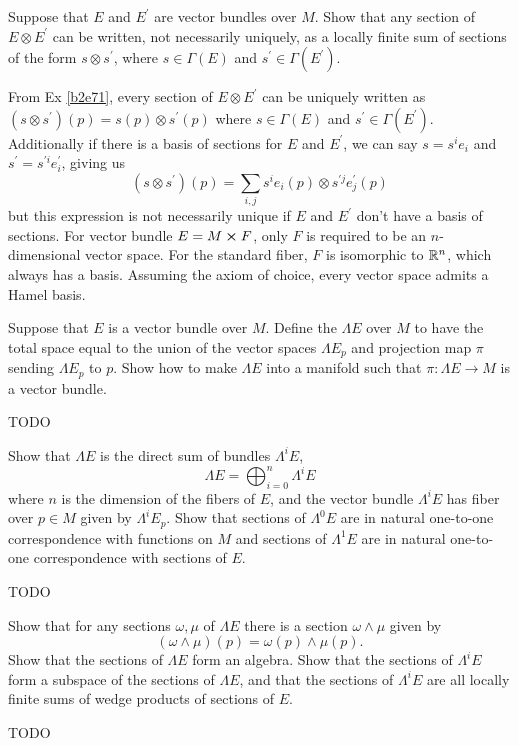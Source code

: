 \documentclass[10pt]{article}
\begin{document}
\begin{example}\label{b2e72}
	Suppose that $E$ and $E^\prime$ are vector bundles over $M$. Show that any section of $E \otimes E^\prime$ can be written, not necessarily uniquely, as a locally finite sum of sections of the form $s \otimes s^\prime$, where $s \in \Gamma(E)$ and $s^\prime \in \Gamma(E^\prime)$.
\end{example}
\sol From Ex \ref{b2e71}, every section of $E \otimes E^\prime$ can be uniquely written as $(s \otimes s^\prime)(p) = s(p) \otimes s^\prime(p)$ where $s \in \Gamma(E)$ and $s^\prime \in \Gamma(E^\prime)$. Additionally if there is a basis of sections for $E$ and $E^\prime$, we can say $s = s^ie_i$ and $s^\prime = s^{\prime i}e_i^\prime$, giving us
$$
(s \otimes s^\prime)(p) = \sum_{i,j}s^ie_i(p) \otimes s^{\prime j}e_j^\prime(p)
$$
but this expression is not necessarily unique if $E$ and $E^\prime$ don't have a basis of sections. For vector bundle $E = M \cross F$, only $F$ is required to be an $n$-dimensional vector space. For the standard fiber, $F$ is isomorphic to $\mathbb{R}^n$, which always has a basis. Assuming the axiom of choice, every vector space admits a Hamel basis.


\begin{example}
	Suppose that $E$ is a vector bundle over $M$. Define the  $\Lambda E$ over $M$ to have the total space equal to the union of the vector spaces $\Lambda E_p$ and projection map $\pi$ sending $\Lambda E_p$ to $p$. Show how to make $\Lambda E$ into a manifold such that $\pi:\Lambda E \to M$ is a vector bundle.
\end{example}
\sol TODO


\begin{example}
	Show that $\Lambda E$ is the direct sum of bundles $\Lambda^i E$,
	$$
	\Lambda E = \bigoplus_{i=0}^{n} \Lambda^i E
	$$
	where $n$ is the dimension of the fibers of $E$, and the vector bundle $\Lambda^i E$ has fiber over $p\in M$ given by $\Lambda^i E_p$. Show that sections of $\Lambda^0 E$ are in natural one-to-one correspondence with functions on $M$ and sections of $\Lambda^1 E$ are in natural one-to-one correspondence with sections of $E$.
\end{example}
\sol TODO


\begin{example}
	Show that for any sections $\omega,\mu$ of $\Lambda E$ there is a section $\omega \wedge \mu$ given by
	$$
	(\omega \wedge \mu)(p) = \omega(p) \wedge \mu(p).
	$$
	Show that the sections of $\Lambda E$ form an algebra. Show that the sections of $\Lambda^i E$ form a subspace of the sections of $\Lambda E$, and that the sections of $\Lambda^i E$ are all locally finite sums of wedge products of sections of $E$.
\end{example}
\sol TODO
\end{document}

